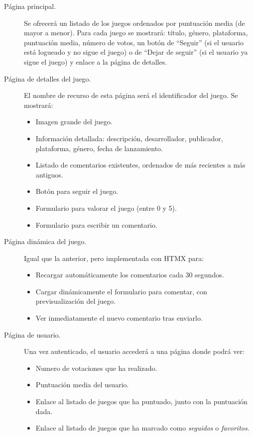 \begin{description}
\item[Página principal.] Se ofrecerá un listado de los juegos ordenados por puntuación media (de mayor a menor). Para cada juego se mostrará: título, género, plataforma, puntuación media, número de votos, un botón de ``Seguir'' (si el usuario está logueado y no sigue el juego) o de ``Dejar de seguir'' (si el usuario ya sigue el juego) y enlace a la página de detalles.

\item[Página de detalles del juego.] El nombre de recurso de esta página será el identificador del juego. Se mostrará:
\begin{itemize}
\item Imagen grande del juego.
\item Información detallada: descripción, desarrollador, publicador, plataforma, género, fecha de lanzamiento.
\item Listado de comentarios existentes, ordenados de más recientes a más antiguos.
\item Botón para seguir el juego.
\item Formulario para valorar el juego (entre 0 y 5).
\item Formulario para escribir un comentario.
\end{itemize}

\item[Página dinámica del juego.] Igual que la anterior, pero implementada con HTMX para:
\begin{itemize}
\item Recargar automáticamente los comentarios cada 30 segundos.
\item Cargar dinámicamente el formulario para comentar, con previsualización del juego.
\item Ver inmediatamente el nuevo comentario tras enviarlo.
\end{itemize}

\item[Página de usuario.] Una vez autenticado, el usuario accederá a una página donde podrá ver:
\begin{itemize}
\item Numero de votaciones que ha realizado.
\item Puntuación media del usuario.
\item Enlace al listado de juegos que ha puntuado, junto con la puntuación dada.
\item Enlace al listado de juegos que ha marcado como \textit{seguidos} o \textit{favoritos}.
\end{itemize}


\end{description}
